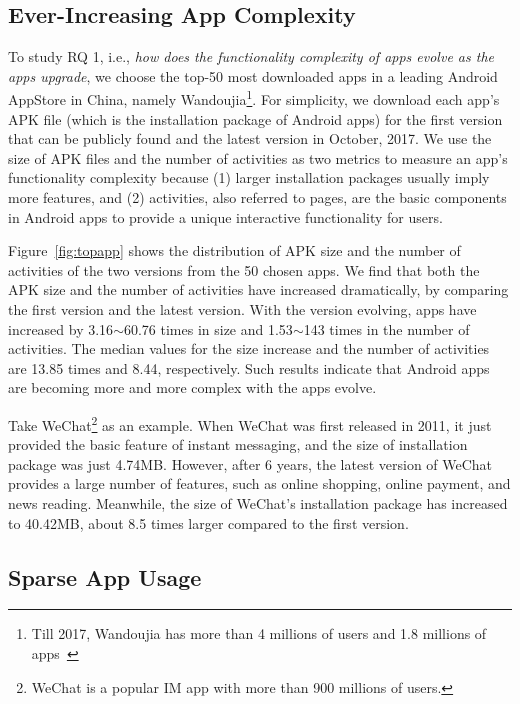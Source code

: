 \subsection{Ever-Increasing App Complexity}
To study RQ 1, i.e., \emph{how does the functionality complexity of apps evolve as the apps upgrade}, we choose the top-50 most downloaded apps in a leading Android AppStore in China, namely  Wandoujia\footnote{Till 2017, Wandoujia has more than 4 millions of users and 1.8 millions of apps~\cite{wandoujia}}.
For simplicity, we download each app's APK file (which is the installation package of Android apps)  for the first version that can be publicly found and the latest version in October, 2017.
We use the size of APK files and the number of activities as two metrics to measure an app's functionality complexity because (1) larger installation packages usually imply more features, and (2)  activities, also referred to pages, are the basic components in Android apps to provide a unique interactive functionality for users.

Figure~\ref{fig:topapp} shows the distribution of APK size and the number of activities of the two versions from the 50 chosen apps.
We find that both the APK size and the number of activities have increased dramatically, by comparing the first version and the latest version.
With the version evolving, apps have increased by 3.16$\sim$60.76 times in size and 1.53$\sim$143 times in the number of activities.
The median values for the size increase and the number of activities are 13.85 times and 8.44, respectively.
Such results indicate that Android apps are becoming more and more complex with the apps evolve.

Take WeChat\footnote{WeChat is a popular IM app with more than 900 millions of users.} as an example. When WeChat was first released in 2011, it just provided the basic feature of instant messaging, and the size of installation package was just 4.74MB. However, after 6 years, the latest version of WeChat provides a large number of features, such as online shopping, online payment, and news reading. Meanwhile, the size of WeChat's installation package has increased to 40.42MB, about 8.5 times larger compared to the first version.


\subsection{Sparse App Usage}

